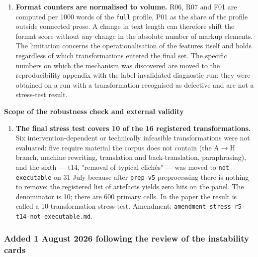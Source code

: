 \documentclass[11pt,a4paper]{article}
\renewcommand{\_}{\textunderscore\allowbreak}
\begin{document}
\begin{enumerate}
\item[23.] \textbf{Format counters are normalised to volume.} R06, R07 and F01 are computed per 1000 words of the \texttt{full} profile, P01 as the share of the profile outside connected prose. A change in text length can therefore shift the format score without any change in the absolute number of markup elements. The limitation concerns the operationalisation of the features itself and holds regardless of which transformations entered the final set. The specific numbers on which the mechanism was discovered are moved to the reproducibility appendix with the label invalidated diagnostic run: they were obtained on a run with a transformation recognised as defective and are not a stress-test result.
\end{enumerate}

\textbf{Scope of the robustness check and external validity}

\begin{enumerate}
\item[24.] \textbf{The final stress test covers 10 of the 16 registered transformations.} Six intervention-dependent or technically infeasible transformations were not evaluated: five require material the corpus does not contain (the A$\to$H branch, machine rewriting, translation and back-translation, paraphrasing), and the sixth — t14, "removal of typical clich\'es" — was moved to \texttt{not executable} on 31 July because after \texttt{prep-\allowbreak{}v5} preprocessing there is nothing to remove: the registered list of artefacts yields zero hits on the panel. The denominator is 10; there are 600 primary cells. In the paper the result is called a 10-transformation stress test. Amendment: \texttt{amendment-\allowbreak{}stress-\allowbreak{}r5-\allowbreak{}t14-\allowbreak{}not-\allowbreak{}executable.md}.
\end{enumerate}

\subsubsection{Added 1 August 2026 following the review of the instability cards}
\end{document}
